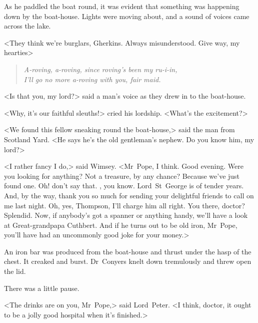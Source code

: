 As he paddled the boat round, it was evident that something was happening down by the boat-house. Lights were moving about, and a sound of voices came across the lake.

<They think we're burglars, Gherkins. Always misunderstood. Give way, my hearties\longdash>

\begin{verse}\itshape
A-roving, a-roving, since roving's been my ru-i-in,\\
I'll go no more a-roving with you, fair maid.
\end{verse}

<Is that you, my lord?> said a man's voice as they drew in to the boat-house.

<Why, it's our faithful sleuths!> cried his lordship. <What's the excitement?>

<We found this fellow sneaking round the boat-house,> said the man from Scotland Yard. <He says he's the old gentleman's nephew. Do you know him, my lord?>

<I rather fancy I do,> said Wimsey. <Mr~Pope, I think. Good evening. Were you looking for anything? Not a treasure, by any chance? Because we've just found one. Oh! don't say that. , you know. Lord~St~George is of tender years. And, by the way, thank you so much for sending your delightful friends to call on me last night. Oh, yes, Thompson, I'll charge him all right. You there, doctor? Splendid. Now, if anybody's got a spanner or anything handy, we'll have a look at Great-grandpapa Cuthbert. And if he turns out to be old iron, Mr~Pope, you'll have had an uncommonly good joke for your money.>

An iron bar was produced from the boat-house and thrust under the hasp of the chest. It creaked and burst. Dr~Conyers knelt down tremulously and threw open the lid.

There was a little pause.

<The drinks are on you, Mr~Pope,> said Lord~Peter. <I think, doctor, it ought to be a jolly good hospital when it's finished.>